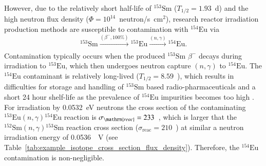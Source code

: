 \documentclass[../main.tex]{subfiles}
\begin{document}
However, due to the relatively short half-life of $^{153}\mathrm{Sm}$ ($T_{1/2} = 1.93$~\si{\day}) and the high neutron flux density ($\Phi=10^{14}$~neutron/\si{\second\centi\meter}$^{2}$), research reactor irradiation production methods are susceptible to contamination with $^{154}\mathrm{Eu}$ \cite{naseri2021effective,van2018separation} via
\begin{equation}
^{153}\mathrm{Sm}\xrightarrow[]{\left(\beta^{-},\mathrm{100\%}\right)}{}^{153}\mathrm{Eu}\xrightarrow[]{\left(n,\gamma\right)}{}^{154}\mathrm{Eu}.
\label{eq:153Sm_reactor_contamination}    
\end{equation}
Contamination typically occurs when the produced $^{153}\mathrm{Sm}$ $\beta^{-}$ decays during irradiation to $^{153}\mathrm{Eu}$, which then undergoes neutron capture $\left(n,\gamma\right)$ to $^{154}\mathrm{Eu}$. The $^{154}\mathrm{Eu}$ contaminant is relatively long-lived ($T_{1/2} = 8.59$~), which results in difficulties for storage and handling of $^{153}\mathrm{Sm}$ based radio-pharmaceuticals and a short 24 hour shelf-life \cite{ema2015quadramet} as the prevalence of $^{154}\mathrm{Eu}$ impurities becomes too high \cite{van2018separation}. For irradiation by 0.0532~\si{\electronvolt} neutrons the cross section of the contaminating $^{153}\mathrm{Eu}\left(n,\gamma\right){}^{154}\mathrm{Eu}$ reaction is $\sigma_{\mathrn{reac}} = 233$~\si{\barns}, which is larger that the $^{152}\mathrm{Sm}\left(n,\gamma\right){}^{153}\mathrm{Sm}$ reaction cross section ($\sigma_{\mathrm{reac}} = 210$~\si{\barns}) at similar a neutron irradiation energy of 0.0536~\si{\electron\volt} (see Table~\ref{tab:example_isotope_cross_section_flux_density}). Therefore, the $^{154}\mathrm{Eu}$ contamination is non-negligible. 
\end{document}
